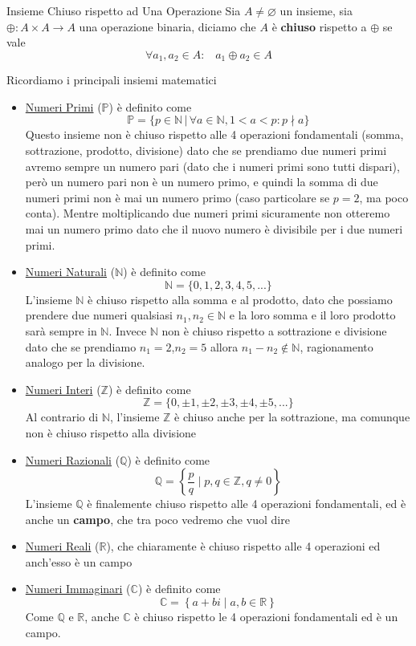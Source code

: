 \documentclass{rapport}
\begin{document}
\newpage
{}
\begin{definizione}{Insieme Chiuso rispetto ad Una Operazione}{}
Sia $A \neq \varnothing$ un insieme, sia $\oplus: A \times A \to A$ una operazione binaria, diciamo che $A$ è \textbf{chiuso} rispetto a $\oplus$ se vale
\[
\forall a_1, a_2 \in A : \;\;\; a_1 \oplus a_2 \in A 
\] 
\end{definizione}
Ricordiamo i principali insiemi matematici 
\begin{itemize}
   \item \underline{Numeri Primi} ($\mathbb{P}$) è definito come
  \[
  \mathbb{P} = \{p \in \mathbb{N} \, | \, \forall a \in \mathbb{N}, 1 < a < p : p \nmid a\}
  \]
   Questo insieme non è chiuso rispetto alle 4 operazioni fondamentali (somma, sottrazione, prodotto, divisione)  dato che se prendiamo due numeri primi avremo sempre un numero pari (dato che i numeri primi sono tutti dispari), però un numero pari non è un numero primo, e quindi la somma di due numeri primi non è mai un numero primo (caso particolare se $p=2$, ma poco conta). Mentre moltiplicando due numeri primi sicuramente non otteremo mai un numero primo dato che il nuovo numero è divisibile per i due numeri primi. 
  \item \underline{Numeri Naturali} ($\mathbb{N}$) è definito come
  \[
  \mathbb{N} = \{0, 1, 2,3, 4, 5, ...\}
  \]
  L'insieme $\mathbb{N}$ è chiuso rispetto alla somma e al prodotto, dato che possiamo prendere due numeri qualsiasi $n_1, n_2 \in \mathbb{N}$ e la loro somma e il loro prodotto sarà sempre in $\mathbb{N}$. Invece $\mathbb{N}$ non è chiuso rispetto a sottrazione e divisione dato che se prendiamo $n_1 = 2$,$n_2 = 5$ allora $n_1-n_2 \notin \mathbb{N}$, ragionamento analogo per la divisione.
  \item \underline{Numeri Interi} ($\mathbb{Z}$) è definito come
  \[
  \mathbb{Z} = \{0, \pm 1, \pm 2,\pm3, \pm4, \pm5, ...\}
  \]
   Al contrario di $\mathbb{N}$, l'insieme $\mathbb{Z}$ è chiuso anche per la sottrazione, ma comunque non è chiuso rispetto alla divisione
    \item \underline{Numeri Razionali} ($\mathbb{Q}$) è definito come
  \[
  \mathbb{Q} = \left\{\dfrac{p}{q} \; | \; p, q \in \mathbb{Z}, q \ne 0 \right\}
  \]
  L'insieme $\mathbb{Q} $ è finalemente chiuso rispetto alle 4 operazioni fondamentali, ed è anche un \textbf{campo}, che tra poco vedremo che vuol dire
  \item \underline{Numeri Reali} ($\mathbb{R}$), che chiaramente è chiuso rispetto alle 4 operazioni ed anch'esso è un campo
  \item \underline{Numeri Immaginari} ($\mathbb{C}$) è definito come
  \[
  \mathbb{C} = \left\{a+bi  \; | \; a, b \in \mathbb{R} \right\}
  \]
  Come $\mathbb{Q} $ e $\mathbb{R} $, anche $\mathbb{C} $ è chiuso rispetto le 4 operazioni fondamentali ed è un campo.
\end{itemize}
\end{document}
